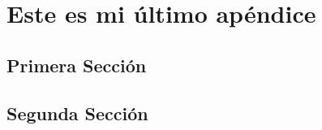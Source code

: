 
\chapter{Este es mi último apéndice} %

\label{AppendC} %

\section{Primera Sección}

\section{Segunda Sección}
